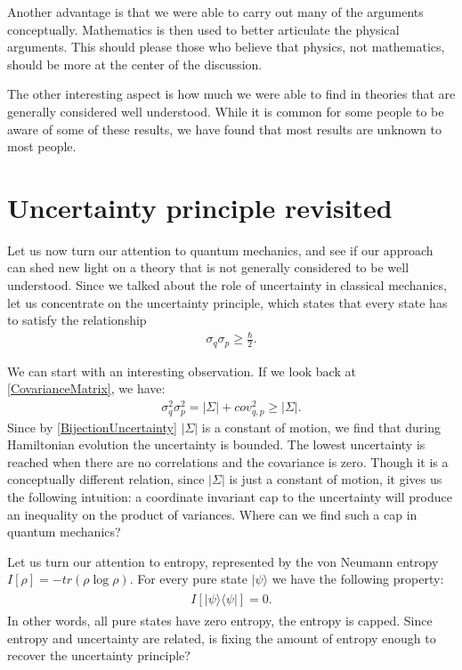 \documentclass[10pt,twocolumn, nofootinbib]{revtex4-2}
\begin{document}
Another advantage is that we were able to carry out many of the arguments conceptually. Mathematics is then used to better articulate the physical arguments. This should please those who believe that physics, not mathematics, should be more at the center of the discussion.\cite{hossenfelder2018lost, woit2006not}

The other interesting aspect is how much we were able to find in theories that are generally considered well understood. While it is common for some people to be aware of some of these results, we have found that most results are unknown to most people.

\section{Uncertainty principle revisited}

Let us now turn our attention to quantum mechanics, and see if our approach can shed new light on a theory that is not generally considered to be well understood. Since we talked about the role of uncertainty in classical mechanics, let us concentrate on the uncertainty principle, which states that every state has to satisfy the relationship
\begin{align}\label{UncertaintyPrinciple}
	\sigma_q \sigma_p \geq \frac{\hbar}{2}.
\end{align}

We can start with an interesting observation. If we look back at \eqref{CovarianceMatrix}, we have:
\begin{align}
	\sigma_q^2 \sigma_p^2 = |\Sigma| + cov_{q,p}^2 \geq |\Sigma|.
\end{align}
Since by \eqref{BijectionUncertainty} $|\Sigma|$ is a constant of motion, we find that during Hamiltonian evolution the uncertainty is bounded. The lowest uncertainty is reached when there are no correlations and the covariance is zero. Though it is a conceptually different relation, since $|\Sigma|$ is just a constant of motion, it gives us the following intuition: a coordinate invariant cap to the uncertainty will produce an inequality on the product of variances. Where can we find such a cap in quantum mechanics?

Let us turn our attention to entropy, represented by the von Neumann entropy $I[\rho] = - tr (\rho \log \rho)$. For every pure state $|\psi \rangle$ we have the following property:
\begin{align}\label{ZeroQuantumEntropy}
	\begin{split}
		I[|\psi\rangle\langle\psi|] = 0.
	\end{split}
\end{align}
In other words, all pure states have zero entropy, the entropy is capped. Since entropy and uncertainty are related, is fixing the amount of entropy enough to recover the uncertainty principle?
\end{document}
